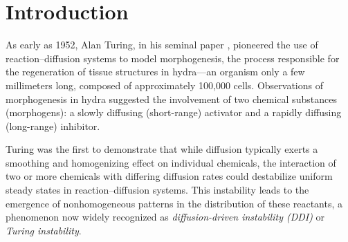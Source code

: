 \documentclass[leqno,12pt]{article}
\numberwithin{equation}{section}
\begin{document}

\medskip




\section{Introduction}



As early as 1952,  Alan Turing, in his seminal paper \cite{T52}, pioneered the use of reaction–diffusion systems to model morphogenesis, the process responsible for the regeneration of tissue structures in hydra—an organism only a few millimeters long, composed of approximately 100,000 cells. Observations of morphogenesis in hydra suggested the involvement of two chemical substances (morphogens): a slowly diffusing (short-range) activator and a rapidly diffusing (long-range) inhibitor.

Turing was the first to demonstrate that while diffusion typically exerts a smoothing and homogenizing effect on individual chemicals, the interaction of two or more chemicals with differing diffusion rates could destabilize uniform steady states in reaction–diffusion systems. This instability leads to the emergence of nonhomogeneous patterns in the distribution of these reactants, a phenomenon now widely recognized as {\it diffusion-driven instability (DDI)} or {\it Turing instability}.
\end{document}
